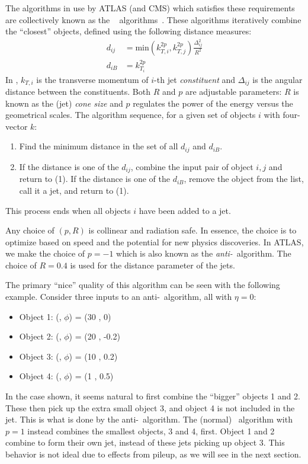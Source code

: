 The algorithms in use by ATLAS (and CMS) which satisfies these requirements are collectively known as the \kt~ algorithms~\cite{Ellis:1993tq,Cacciari:2005hq,Cacciari:2008gp}.
These algorithms iteratively combine the ``closest'' objects, defined using the following distance measures:
\begin{equation}
\begin{aligned}\label{eq:kt}
d_{ij} &= \text{min}(k_{T,i}^{2p} , k_{T,j}^{2p} )  \frac{\Delta_{ij}^2 }{R^2} \\
d_{iB} &= k_{T_i}^{2p}
\end{aligned}
\end{equation}
In , $k_{T,i}$ is the transverse momentum of $i$-th jet \textit{constituent} and $\Delta_{ij}$ is the angular distance \deltaR between the constituents.
Both $R$ and $p$ are adjustable parameters: $R$ is known as the (jet) \textit{cone size} and $p$ regulates the power of the energy versus the geometrical scales.
The algorithm sequence, for a given set of objects $i$ with four-vector $k$:
\begin{enumerate}
\item Find the minimum distance in the set of all $d_{ij}$ and $d_{iB}$.
\item If the distance is one of the $d_{ij}$, combine the input pair of object $i,j$ and return to (1).
If the distance is one of the $d_{iB}$, remove the object from the list, call it a jet, and return to (1).
\end{enumerate}
This process ends when all objects $i$ have been added to a jet.

Any choice of $(p,R)$ is collinear and radiation safe.
In essence, the choice is to optimize based on speed and the potential for new physics discoveries.
In ATLAS, we make the choice of $p = -1$ which is also known as the \textit{anti-}\kt~algorithm.
The choice of $R = 0.4$ is used for the distance parameter of the jets.

The primary ``nice'' quality of this algorithm can be seen with the following example.
Consider three inputs to an anti-\kt~algorithm, all with $\eta = 0$:
\begin{itemize}
\item Object 1: (\pt, $\phi$) = (30 \GeV, 0)
\item Object 2: (\pt, $\phi$) = (20 \GeV, -0.2)
\item Object 3: (\pt, $\phi$) = (10 \GeV, 0.2)
\item Object 4: (\pt, $\phi$) = (1  \GeV, 0.5)
\end{itemize}
In the case shown, it seems natural to first combine the ``bigger'' objects 1 and 2.
These then pick up the extra small object 3, and object 4 is not included in the jet.
This is what is done by the anti-\kt~algorithm.
The (normal) \kt~algorithm with $p = 1$ instead combines the smallest objects, 3 and 4, first.
Object 1 and 2 combine to form their own jet, instead of these jets picking up object 3.
This behavior is not ideal due to effects from pileup, as we will see in the next section.

